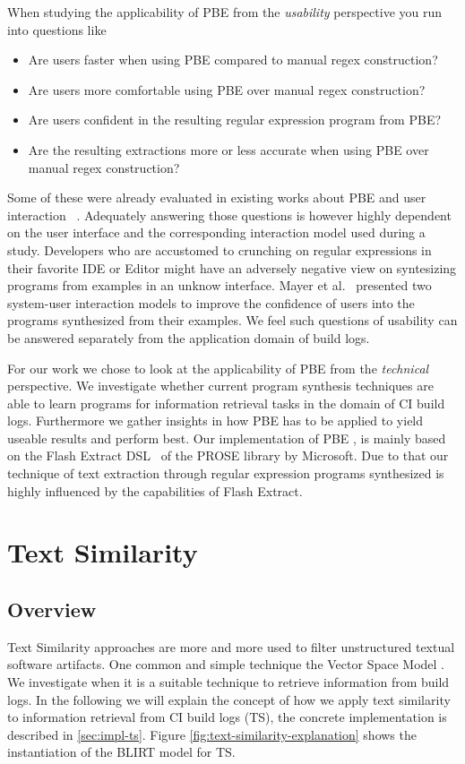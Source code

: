 \documentclass[\myrootdir/main.tex]{subfiles}
\begin{document}
When studying the applicability of PBE from the \emph{usability} perspective you run into questions like
\begin{itemize}
	\item Are users faster when using PBE compared to manual regex construction?
	\item Are users more comfortable using PBE over manual regex construction?
	\item Are users confident in the resulting regular expression program from PBE?
	\item Are the resulting extractions more or less accurate when using PBE over manual regex construction?
\end{itemize}
Some of these were already evaluated in existing works about PBE and user interaction~\cite{mayer2015user} .
Adequately answering those questions is however highly dependent on the user interface and the corresponding interaction model used during a study.
Developers who are accustomed to crunching on regular expressions in their favorite IDE or Editor might have an adversely negative view on syntesizing programs from examples in an unknow interface.
Mayer et al.~\cite{mayer2015user} presented two system-user interaction models to improve the confidence of users into the programs synthesized from their examples.
We feel such questions of usability can be answered separately from the application domain of build logs.

For our work we chose to look at the applicability of PBE from the \emph{technical} perspective.
We investigate whether current program synthesis techniques are able to learn programs for information retrieval tasks in the domain of CI build logs.
Furthermore we gather insights in how PBE has to be applied to yield useable results and perform best.
Our implementation of PBE , is mainly based on the Flash Extract DSL~\cite{flahsextractpaper} of the PROSE library by Microsoft.
Due to that our technique of text extraction through regular expression programs synthesized is highly influenced by the capabilities of Flash Extract.

\section{Text Similarity}

\subsection{Overview}
Text Similarity approaches are more and more used to filter unstructured textual software artifacts. 
One common and simple technique the Vector Space Model .
We investigate when it is a suitable technique to retrieve information from build logs.
In the following we will explain the concept of how we apply text similarity to information retrieval from CI build logs (TS), the concrete implementation is described in \ref{sec:impl-ts}.
Figure \ref{fig:text-similarity-explanation} shows the instantiation of the BLIRT model for TS.
\end{document}
